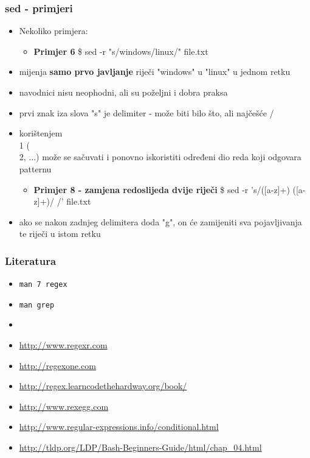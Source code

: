 \documentclass[table,usenames,dvipsnames]{beamer}
\newcommand{\shell}[1]{\texttt{#1}}
\begin{document}
\begin{frame}
\frametitle{sed - primjeri}
	\begin{itemize}
	    \item Nekoliko primjera:
		\begin{itemize}
			\item \textbf{Primjer 6}
			\small \$ sed -r "s/windows/linux/" file.txt
		\end{itemize}

		\item mijenja \textbf{samo prvo javljanje} riječi "windows" u "linux" u jednom retku
		\item navodnici nisu neophodni, ali su poželjni i dobra praksa
		\item prvi znak iza slova "s" je delimiter - može biti bilo što, ali najčešće /
	\end{itemize}
\end{frame}

\begin{frame}
    \begin{itemize}
		\begin{itemize}
			\item \textbf{Primjer 7}
			\small \$ sed -r "s/\textasciicircum{}Tekst ([[:digit:]])\. reda\$/Promijenili 
			smo \1. red/" file.txt
		\end{itemize}

		\item korištenjem \\1 (\\2, ...) može se sačuvati i ponovno iskoristiti određeni dio reda koji odgovara patternu

		\begin{itemize}
			\item \textbf{Primjer 8 - zamjena redoslijeda dvije riječi}
			\small \$ sed -r 's/([a-z]+) ([a-z]+)/\2 \1/' file.txt
		\end{itemize}

		\item ako se nakon zadnjeg delimitera doda "g", on će zamijeniti sva pojavljivanja te riječi u istom retku
	\end{itemize}
\end{frame}

\begin{frame}[t]
\frametitle{Literatura}
\begin{itemize}
	\item[] \shell{man 7 regex}
	\item[] \shell{man grep}
	\item[]
  \item[] \small\url{http://www.regexr.com}
  \item[] \small\url{http://regexone.com}
  \item[] \small\url{http://regex.learncodethehardway.org/book/}
  \item[] \small\url{http://www.rexegg.com}
  \item[] \small\url{http://www.regular-expressions.info/conditional.html} 
  \item[] \small\url{http://tldp.org/LDP/Bash-Beginners-Guide/html/chap_04.html}
\end{itemize}
\end{frame}
\end{document}
